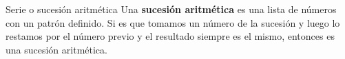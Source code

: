 \begin{infocard}{Serie o sucesión aritmética}
    Una \textbf{sucesión aritmética} es una lista de números con un patrón definido. Si es que tomamos un número de la sucesión y luego lo restamos por el número previo y el resultado siempre es el mismo, entonces es una sucesión aritmética.
\end{infocard}